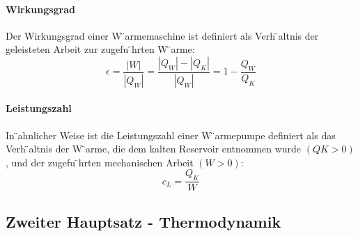 \documentclass[7pt]{article}
\begin{document}
\begin{multicols*}{3}
\paragraph{Wirkungsgrad}
Der Wirkungsgrad einer W ̈armemaschine ist definiert als Verh ̈altnis der geleisteten Arbeit zur zugefu ̈hrten W ̈arme:
\begin{equation}
	\epsilon=\frac{|W|}{|Q_W|}=\frac{|Q_W|-|Q_K|}{|Q_W|}=1-\frac{Q_W}{Q_K}
\end{equation}
\paragraph{Leistungszahl}
In  ̈ahnlicher Weise ist die Leistungszahl einer W ̈armepumpe definiert als das Verh ̈altnis der W ̈arme, die dem kalten Reservoir entnommen wurde $(QK > 0)$, und der zugefu ̈hrten mechanischen Arbeit $(W > 0)$:
\begin{equation}
	c_L=\frac{Q_K}{W}
\end{equation}

\subsection{Zweiter Hauptsatz - Thermodynamik}


\end{multicols*}
\end{document}
